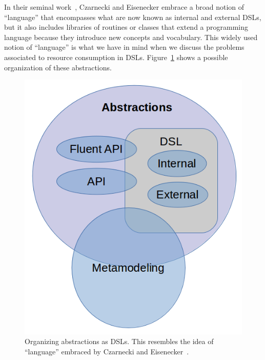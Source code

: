 In their seminal work~\cite{Czarnecki2000}, Czarnecki and Eisenecker embrace a broad notion of ``language'' that encompasses what are now known as internal and external DSLs, but it also includes libraries of routines or classes that extend a programming language because they introduce new concepts and vocabulary.
This widely used notion of ``language'' is what we have in mind when we discuss the problems associated to resource consumption in DSLs.
Figure~\ref{fig:dsl-hierarchy} shows a possible organization of these abstractions.

\begin{figure}
\centering
\includegraphics[scale=0.5]{./chapter2/fig/dsl-hierarchy.png}
\caption{Organizing abstractions as DSLs. This resembles the idea of ``language'' embraced by Czarnecki and Eisenecker~\cite{Czarnecki2000}.}\label{fig:dsl-hierarchy}
\end{figure}

